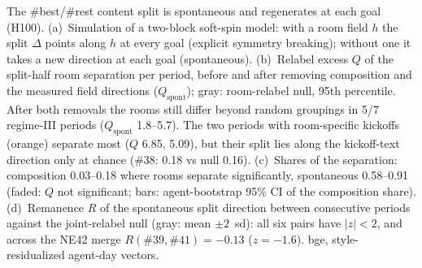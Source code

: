 \caption{The \#best/\#rest content split is spontaneous and regenerates at each goal (H100). (a)~Simulation of a two-block soft-spin model: with a room field $h$ the split $\Delta$ points along $h$ at every goal (explicit symmetry breaking); without one it takes a new direction at each goal (spontaneous). (b)~Relabel excess $Q$ of the split-half room separation per period, before and after removing composition and the measured field directions ($Q_\mathrm{spont}$); gray: room-relabel null, 95th percentile. After both removals the rooms still differ beyond random groupings in 5/7 regime-III periods ($Q_\mathrm{spont}$ 1.8--5.7). The two periods with room-specific kickoffs (orange) separate most ($Q$ 6.85, 5.09), but their split lies along the kickoff-text direction only at chance (\#38: 0.18 vs null 0.16). (c)~Shares of the separation: composition 0.03--0.18 where rooms separate significantly, spontaneous 0.58--0.91 (faded: $Q$ not significant; bars: agent-bootstrap 95\% CI of the composition share). (d)~Remanence $R$ of the spontaneous split direction between consecutive periods against the joint-relabel null (gray: mean $\pm2$~sd): all six pairs have $|z|<2$, and across the NE42 merge $R(\#39,\#41)=-0.13$ ($z=-1.6$). bge, style-residualized agent-day vectors.}
\label{fig:H100}
